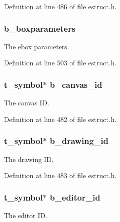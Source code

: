 Definition at line 486 of file estruct.\-h.

\hypertarget{struct__edspbox_a01fa53a36dc717c81755d805a868ad9d}{
\subsubsection[{b\-\_\-boxparameters}]{ b\-\_\-boxparameters}}\label{struct__edspbox_a01fa53a36dc717c81755d805a868ad9d}
The ebox parameters. 

Definition at line 503 of file estruct.\-h.

\hypertarget{struct__edspbox_ac0251c6969a1032f8f50d076e909fb3e}{
\subsubsection[{b\-\_\-canvas\-\_\-id}]{\setlength{\rightskip}{0pt plus 5cm}t\-\_\-symbol$\ast$ b\-\_\-canvas\-\_\-id}}\label{struct__edspbox_ac0251c6969a1032f8f50d076e909fb3e}
The canvas I\-D. 

Definition at line 482 of file estruct.\-h.

\hypertarget{struct__edspbox_a153f9c9929d722ecb29217f3fb0914c9}{
\subsubsection[{b\-\_\-drawing\-\_\-id}]{\setlength{\rightskip}{0pt plus 5cm}t\-\_\-symbol$\ast$ b\-\_\-drawing\-\_\-id}}\label{struct__edspbox_a153f9c9929d722ecb29217f3fb0914c9}
The drawing I\-D. 

Definition at line 483 of file estruct.\-h.

\hypertarget{struct__edspbox_adf8c80c6ea45ad810c754984d98830ff}{
\subsubsection[{b\-\_\-editor\-\_\-id}]{\setlength{\rightskip}{0pt plus 5cm}t\-\_\-symbol$\ast$ b\-\_\-editor\-\_\-id}}\label{struct__edspbox_adf8c80c6ea45ad810c754984d98830ff}
The editor I\-D. 

